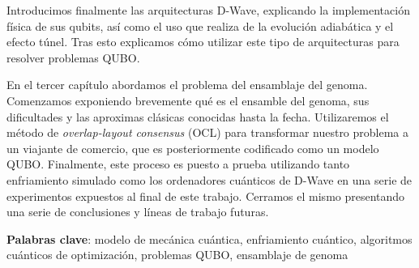 Introducimos finalmente las arquitecturas D-Wave, explicando la implementación física de sus qubits, así como el uso que realiza de la evolución adiabática y el efecto túnel. Tras esto explicamos cómo utilizar este tipo de arquitecturas para resolver problemas QUBO.

En el tercer capítulo abordamos el problema del ensamblaje del genoma. Comenzamos exponiendo brevemente qué es el ensamble del genoma, sus dificultades y las aproximas clásicas conocidas hasta la fecha. Utilizaremos el método de \emph{overlap-layout consensus} (OCL) para transformar nuestro problema a un viajante de comercio, que es posteriormente codificado como un modelo QUBO. Finalmente, este proceso es puesto a prueba utilizando tanto enfriamiento simulado como los ordenadores cuánticos de D-Wave en una serie de experimentos expuestos al final de este trabajo. Cerramos el mismo presentando una serie de conclusiones y líneas de trabajo futuras.

\textbf{Palabras clave}: modelo de mecánica cuántica, enfriamiento cuántico, algoritmos cuánticos de optimización, problemas QUBO, ensamblaje de genoma
